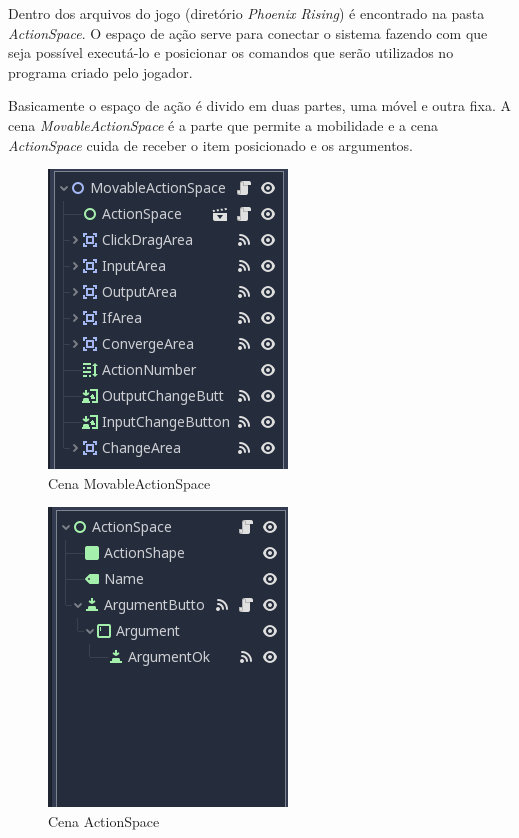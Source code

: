 Dentro dos arquivos do jogo (diretório \textit{Phoenix Rising}) é encontrado na 
pasta \textit{ActionSpace}. O espaço de ação serve para conectar o sistema
fazendo com que seja possível executá-lo e posicionar os comandos que serão
utilizados no programa criado pelo jogador.

Basicamente o espaço de ação é divido em duas partes, uma móvel e outra fixa.
A cena \textit{MovableActionSpace} é a parte que permite a mobilidade e a cena
\textit{ActionSpace} cuida de receber o item posicionado e os argumentos.

\begin{minipage}[c]{0.5\textwidth}
    \begin{figure}[H]
        \includegraphics[scale=0.8]{../figuras/cena_movable_action_space.png}
        \caption{Cena MovableActionSpace}
    \end{figure}
\end{minipage}%
\begin{minipage}[c]{0.6\textwidth}
    \begin{figure}[H]
        \includegraphics[scale=0.8]{../figuras/cena_action_space.png}
        \caption{Cena ActionSpace}
    \end{figure}
\end{minipage}

